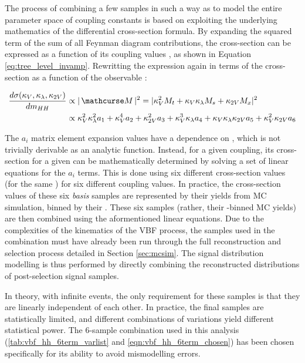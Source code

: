    The process of combining a few samples in such a way as to model the entire parameter space of coupling constants is based on exploiting the underlying mathematics of the differential cross-section formula.
    By expanding the squared term of the sum of all Feynman diagram contributions,
        the cross-section can be expressed as a function of its coupling values \cite{ATLAS-CONF-2019-049}, as shown in Equation \ref{eq:tree_level_invamp}.
    Rewritting the expression again in terms of the cross-section as a function of the observable \mhh:

    \begin{equation} \begin{split} \label{eq:tree_level_invamp_simple}
        \dXsecM &\propto |\invAmp|^2 = |  \kv^2 M_t + \kv \kl M_s + \kvv M_x |^2 \\
        &\propto \kv^2 \kl^2 a_1 + \kv^4 a_2 + \kvv^2 a_3 + \kv^3 \kl a_4 + \kv \kl \kvv a_5 + \kv^2 \kvv a_6
    \end{split} \end{equation}

    The $a_i$ matrix element expansion values have a dependence on \mhh, which is not trivially derivable as an analytic function.
    Instead, for a given coupling, its cross-section for a given \mhh can be mathematically determined by solving a set of linear equations for the $a_i$ terms.
    This is done using six different cross-section values (for the same \mhh) for six different coupling values.
    In practice, the cross-section values of these six \textit{basis} samples are represented by their yields from MC simulation, binned by their \mhh.
    These six samples (rather, their \mhh-binned MC yields) are then combined using the aformentioned linear equations.
    Due to the complexities of the kinematics of the VBF process,
        the samples used in the combination must have already been run through the full reconstruction and selection process detailed in Section \ref{sec:mcsim}.
    The signal distribution modelling is thus performed by directly combining the reconstructed \mhh distributions of post-selection signal samples.

    In theory, with infinite events, the only requirement for these samples is that they are linearly independent of each other.
    In practice, the final samples are statistically limited, and different combinations of variations yield different statistical power.
    The 6-sample combination used in this analysis (\ref{tab:vbf_hh_6term_varlist} and \ref{eqn:vbf_hh_6term_chosen}) has been chosen specifically for its ability to avoid mismodelling errors.

